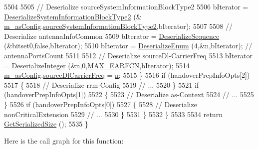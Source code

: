 \begin{DoxyCode}
5504 
5505               \textcolor{comment}{// Deserialize sourceSystemInformationBlockType2}
5506               bIterator = \hyperlink{classns3_1_1RrcAsn1Header_ac76e61e534e302566ccb9771f19498df}{DeserializeSystemInformationBlockType2} (&
      \hyperlink{classns3_1_1HandoverPreparationInfoHeader_adfafc689e36800c0c59d495f74e3bdc1}{m\_asConfig}.\hyperlink{structns3_1_1LteRrcSap_1_1AsConfig_aaf68e6c66f6f3e8230a4f2dd720875a7}{sourceSystemInformationBlockType2},bIterator);
5507 
5508               \textcolor{comment}{// Deserialize antennaInfoCommon}
5509               bIterator = \hyperlink{classns3_1_1Asn1Header_a58c68bb97ba3fe2e8fcdd7c208d672b2}{DeserializeSequence} (&bitset0,\textcolor{keyword}{false},bIterator);
5510               bIterator = \hyperlink{classns3_1_1Asn1Header_a4fcc253e0eec3483c775b005c1875f2d}{DeserializeEnum} (4,&n,bIterator); \textcolor{comment}{// antennaPortsCount}
5511 
5512               \textcolor{comment}{// Deserialize sourceDl-CarrierFreq}
5513               bIterator = \hyperlink{classns3_1_1Asn1Header_a49802c9af30018b078150e866b6ecae2}{DeserializeInteger} (&n,0,\hyperlink{lte-rrc-header_8cc_a7851a91be0aab6446639f0ff8ee48b45}{MAX\_EARFCN},bIterator);
5514               \hyperlink{classns3_1_1HandoverPreparationInfoHeader_adfafc689e36800c0c59d495f74e3bdc1}{m\_asConfig}.\hyperlink{structns3_1_1LteRrcSap_1_1AsConfig_ad69c57a616c9e8dba2cf6f1248c4eae3}{sourceDlCarrierFreq} = \hyperlink{namespacesample-rng-plot_aeb5ee5c431e338ef39b7ac5431242e1d}{n};
5515             \}
5516           \textcolor{keywordflow}{if} (handoverPrepInfoOpts[2])
5517             \{
5518               \textcolor{comment}{// Deserialize rrm-Config}
5519               \textcolor{comment}{// ...}
5520             \}
5521           \textcolor{keywordflow}{if} (handoverPrepInfoOpts[1])
5522             \{
5523               \textcolor{comment}{// Deserialize as-Context}
5524               \textcolor{comment}{// ...}
5525             \}
5526           \textcolor{keywordflow}{if} (handoverPrepInfoOpts[0])
5527             \{
5528               \textcolor{comment}{// Deserialize nonCriticalExtension}
5529               \textcolor{comment}{// ...}
5530             \}
5531         \}
5532     \}
5533 
5534   \textcolor{keywordflow}{return} \hyperlink{classns3_1_1Asn1Header_a18a67eb7869c5784f59d197bbd76a74f}{GetSerializedSize} ();
5535 \}
\end{DoxyCode}


Here is the call graph for this function\+:



